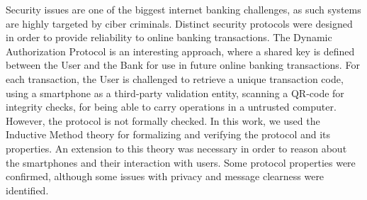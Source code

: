 Security issues are one of the biggest internet banking challenges, as such systems are highly targeted by ciber criminals. Distinct security protocols were designed in order to provide reliability to online banking transactions. The Dynamic Authorization Protocol is an interesting approach, where a shared key is defined between the User and the Bank for use in future online banking transactions. For each transaction, the User is challenged to retrieve a unique transaction code, using a smartphone as a third-party validation entity, scanning a QR-code for integrity checks, for being able to carry operations in a untrusted computer. However, the protocol is not formally checked. In this work, we used the Inductive Method theory for formalizing and verifying the protocol and its properties. An extension to this theory was necessary in order to reason about the smartphones and their interaction with users. Some protocol properties were confirmed, although some issues with privacy and message clearness were identified.